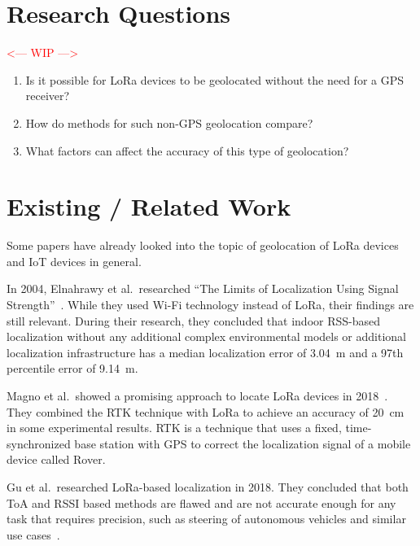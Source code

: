 \section{Research Questions}\label{sec:introduction-research-questions}


\textcolor{red}{<--- WIP --->}

\begin{enumerate}
      \item Is it possible for \ac{LoRa} devices to be geolocated without the need for a \ac{GPS} receiver?
      \item How do methods for such non-\ac{GPS} geolocation compare?
      \item What factors can affect the accuracy of this type of geolocation?
\end{enumerate}

\section{Existing / Related Work}\label{sec:related-work}

Some papers have already looked into the topic of geolocation of \ac{LoRa} devices and \ac{IoT} devices in general.

In 2004, Elnahrawy et al.\ researched ``The Limits of Localization Using Signal Strength''~\cite{elnahrawy_limits_2004}.
While they used Wi-Fi technology instead of \ac{LoRa}, their findings are still relevant.
During their research, they concluded that indoor \ac{RSS}-based localization without any additional complex environmental models or additional localization infrastructure has a median localization error of \SI{3.04}{\meter} and a 97th percentile error of \SI{9.14}{\meter}.

Magno et al.\ showed a promising approach to locate \ac{LoRa} devices in 2018~\cite{magno_poster_2018}.
They combined the \acf{RTK} technique with \ac{LoRa} to achieve an accuracy of \SI{20}{\centi\meter} in some experimental results.
\ac{RTK} is a technique that uses a fixed, time-synchronized base station with \ac{GPS} to correct the localization signal of a mobile device called Rover.

Gu et al.\ researched \ac{LoRa}-based localization in 2018.
They concluded that both \ac{ToA} and \ac{RSSI} based methods are flawed and are not accurate enough for any task that requires precision, such as steering of autonomous vehicles and similar use cases~\cite{gu_lora-based_2018}.

